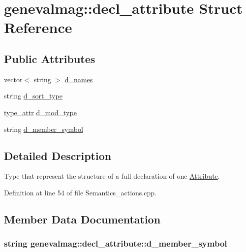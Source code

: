 \hypertarget{structgenevalmag_1_1decl__attribute}{
\section{genevalmag::decl\_\-attribute Struct Reference}
\label{structgenevalmag_1_1decl__attribute}
}
\subsection*{Public Attributes}
\begin{CompactItemize}
\item 
vector$<$ string $>$ \hyperlink{structgenevalmag_1_1decl__attribute_c4ea14cc1989803540508a67dc7ff13c}{d\_\-names}
\item 
string \hyperlink{structgenevalmag_1_1decl__attribute_124f1e6a8dc3316c94e8c3c61cc72254}{d\_\-sort\_\-type}
\item 
\hyperlink{namespacegenevalmag_0ae71e3da3851df63075a93820da40af}{type\_\-attr} \hyperlink{structgenevalmag_1_1decl__attribute_2b7f92bae66963a05669e87a7ccb1810}{d\_\-mod\_\-type}
\item 
string \hyperlink{structgenevalmag_1_1decl__attribute_07dd5a1372cfd1e87525ae96cdd59487}{d\_\-member\_\-symbol}
\end{CompactItemize}


\subsection{Detailed Description}
Type that represent the structure of a full declaration of one \hyperlink{classgenevalmag_1_1Attribute}{Attribute}. 

Definition at line 54 of file Semantics\_\-actions.cpp.

\subsection{Member Data Documentation}
\hypertarget{structgenevalmag_1_1decl__attribute_07dd5a1372cfd1e87525ae96cdd59487}{
\subsubsection[{d\_\-member\_\-symbol}]{\setlength{\rightskip}{0pt plus 5cm}string {\bf genevalmag::decl\_\-attribute::d\_\-member\_\-symbol}}}
\label{structgenevalmag_1_1decl__attribute_07dd5a1372cfd1e87525ae96cdd59487}




